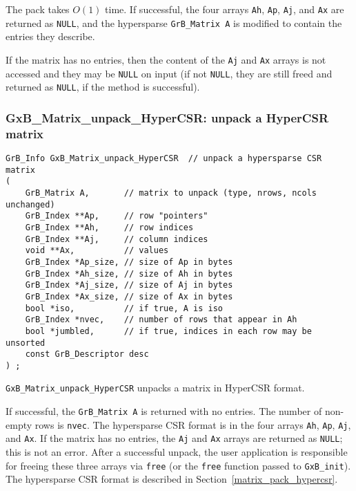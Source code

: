 \documentclass[12pt]{article}
\begin{document}
{The pack takes $O(1)$ time.  If successful, the four arrays \verb'Ah',
\verb'Ap', \verb'Aj', and \verb'Ax' are returned as \verb'NULL', and the
hypersparse \verb'GrB_Matrix A' is modified to contain the entries
they describe.

If the matrix has no entries, then the content of the \verb'Aj' and \verb'Ax' arrays
is not accessed and they may be \verb'NULL' on input (if not \verb'NULL', they
are still freed and returned as \verb'NULL', if the method is successful).

\newpage
\subsubsection{{\sf GxB\_Matrix\_unpack\_HyperCSR:} unpack a HyperCSR matrix}
\label{matrix_unpack_hypercsr}

\begin{mdframed}[userdefinedwidth=6in]
{\footnotesize
\begin{verbatim}
GrB_Info GxB_Matrix_unpack_HyperCSR  // unpack a hypersparse CSR matrix
(
    GrB_Matrix A,       // matrix to unpack (type, nrows, ncols unchanged)
    GrB_Index **Ap,     // row "pointers"
    GrB_Index **Ah,     // row indices
    GrB_Index **Aj,     // column indices
    void **Ax,          // values
    GrB_Index *Ap_size, // size of Ap in bytes
    GrB_Index *Ah_size, // size of Ah in bytes
    GrB_Index *Aj_size, // size of Aj in bytes
    GrB_Index *Ax_size, // size of Ax in bytes
    bool *iso,          // if true, A is iso
    GrB_Index *nvec,    // number of rows that appear in Ah
    bool *jumbled,      // if true, indices in each row may be unsorted
    const GrB_Descriptor desc
) ;
\end{verbatim}
} \end{mdframed}

\verb'GxB_Matrix_unpack_HyperCSR' unpacks a matrix in HyperCSR format.

If successful, the \verb'GrB_Matrix A' is returned with no entries.
The number of non-empty rows is
\verb'nvec'.  The hypersparse CSR format is in the four arrays \verb'Ah',
\verb'Ap', \verb'Aj', and \verb'Ax'.  If the matrix has no entries, the
\verb'Aj' and \verb'Ax' arrays are returned as \verb'NULL'; this is not an
error.  After a successful unpack, the user application is responsible for
freeing these three arrays via \verb'free' (or the \verb'free' function passed
to \verb'GxB_init').  The hypersparse CSR format is described in
Section~\ref{matrix_pack_hypercsr}.

}
\end{document}

